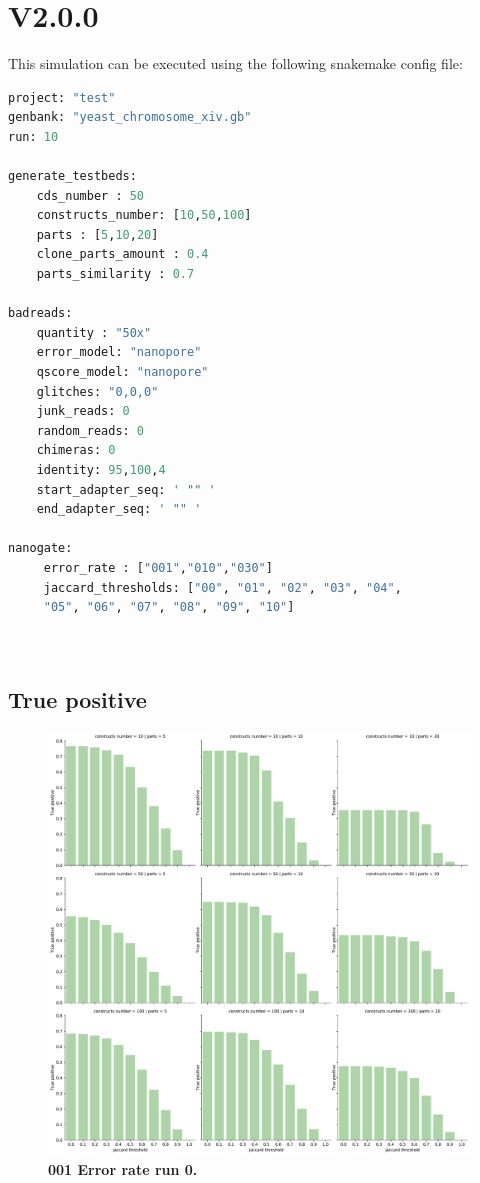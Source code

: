 \documentclass[11pt, a4paper]{article}
\begin{document}
\section{V2.0.0 }
This simulation can be executed using the following snakemake config file:
  \begin{lstlisting}[language=Python]
project: "test"
genbank: "yeast_chromosome_xiv.gb"
run: 10

generate_testbeds:
    cds_number : 50
    constructs_number: [10,50,100]
    parts : [5,10,20]
    clone_parts_amount : 0.4
    parts_similarity : 0.7

badreads:
    quantity : "50x"
    error_model: "nanopore"
    qscore_model: "nanopore"
    glitches: "0,0,0"
    junk_reads: 0
    random_reads: 0
    chimeras: 0
    identity: 95,100,4
    start_adapter_seq: ' "" '
    end_adapter_seq: ' "" '

nanogate:
     error_rate : ["001","010","030"]
     jaccard_thresholds: ["00", "01", "02", "03", "04",
     "05", "06", "07", "08", "09", "10"]

  
\end{lstlisting}

\subsection{True positive }
 \begin{figure}[ht]
      \begin{center}
      \includegraphics[width=1\textwidth]{../results/images_notebook/v_006/001_true_positive.pdf}
      \end{center}
      \caption{{\bf 001 Error rate run 0. }}
     \label{fig:v_006_001}
 \end{figure}
 
\end{document}
